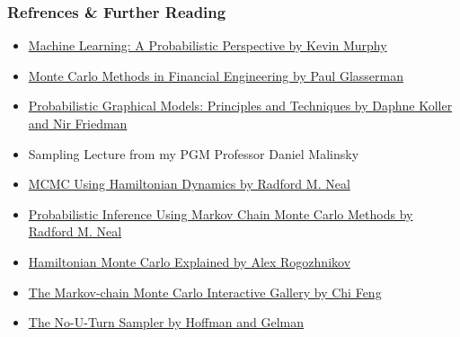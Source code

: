 \documentclass{beamer}
\begin{document}
\begin{frame}
\frametitle{Refrences \& Further Reading}
  \begin{itemize}
    \item \href{https://www.cs.ubc.ca/~murphyk/MLbook/}{Machine Learning: A Probabilistic Perspective by Kevin Murphy}
    \item \href{https://www.springer.com/gp/book/9780387004518}{Monte Carlo Methods in Financial Engineering by Paul Glasserman}
    \item \href{https://mitpress.mit.edu/books/probabilistic-graphical-models}{Probabilistic Graphical Models: Principles and Techniques by Daphne Koller and Nir Friedman}
    \item Sampling Lecture from my PGM Professor Daniel Malinsky
    \item \href{http://www.mcmchandbook.net/HandbookChapter5.pdf}{MCMC Using Hamiltonian Dynamics by Radford M. Neal}
    \item \href{http://www.cs.utoronto.ca/~radford/ftp/review.pdf}{Probabilistic Inference Using Markov Chain Monte Carlo Methods by Radford M. Neal}
    \item \href{http://arogozhnikov.github.io/2016/12/19/markov_chain_monte_carlo.html}{Hamiltonian Monte Carlo Explained by Alex Rogozhnikov}
    \item \href{https://chi-feng.github.io/mcmc-demo/app.html}{The Markov-chain Monte Carlo Interactive Gallery by Chi Feng}
    \item \href{http://www.stat.columbia.edu/~gelman/research/published/nuts.pdf}{The No-U-Turn Sampler by Hoffman and Gelman}
  \end{itemize}
\end{frame}

\end{document}
